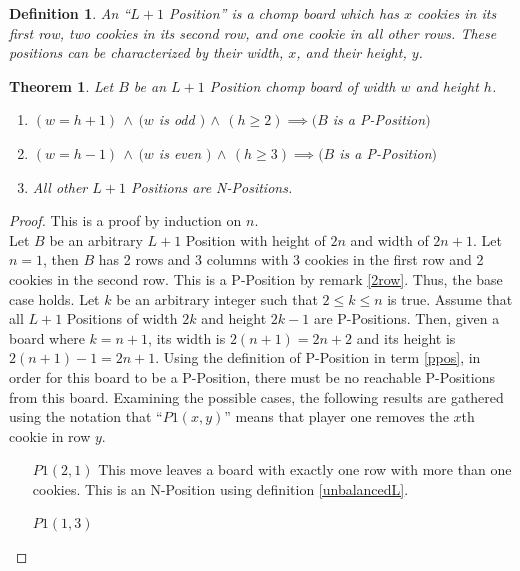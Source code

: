 \documentclass{amsart}
\newtheorem{thm}{Theorem}
\newtheorem{term}{Definition} %
\theoremstyle{definition}
\theoremstyle{remark}
\numberwithin{equation}{section}
\begin{document}

\begin{term}
An ``$L+1$ Position'' is a chomp board which has $x$ cookies in its first row, two cookies in its second row, and one cookie in all other rows. These positions can be characterized by their width, $x$, and their height, $y$.\\ 
\end{term}

\begin{thm}
    \label{almostL}
    Let $B$ be an $L+1$ Position chomp board of width $w$ and height $h$.
    \begin{enumerate}
        \item $(w = h + 1) \,\land\, (w$ is odd $)\,\land\,( h \geq 2) \implies (B$ is a P-Position$)$
        \item $(w = h - 1) \,\land\, (w$ is even $)\,\land\,( h \geq 3) \implies (B$ is a P-Position$)$
        \item All other $L+1$ Positions are N-Positions.
    \end{enumerate}
\end{thm}

\begin{proof}
This is a proof by induction on $n$.\\
Let $B$ be an arbitrary $L+1$ Position with height of $2n$ and width of $2n+1$.  Let $n=1$, then $B$ has 2 rows and 3 columns with 3 cookies in the first row and 2 cookies in the second row.  This is a P-Position by remark \ref{2row}.  Thus, the base case holds.  Let $k$ be an arbitrary integer such that $2\leq k \leq n$ is true.  Assume that all $L+1$ Positions of width $2k$ and height $2k-1$ are P-Positions.  Then, given a board where $k=n+1$, its width is $2(n+1) = 2n+2$ and its height is $2(n+1)-1 = 2n+1$.  Using the definition of P-Position in term \ref{ppos}, in order for this board to be a P-Position, there must be no reachable P-Positions from this board.  Examining the possible cases, the following results are gathered using the  notation that ``$P1(x,y)$'' means that player one removes the $x$th cookie in row $y$.
\begin{enumerate}
    \item [$P1(2, 1)$] This move leaves a board with exactly one row with more than one cookies.  This is an N-Position using definition \ref{unbalancedL}.
    \item [$P1(1, 3)$]
    \end{enumerate}
\end{proof}
\end{document}
